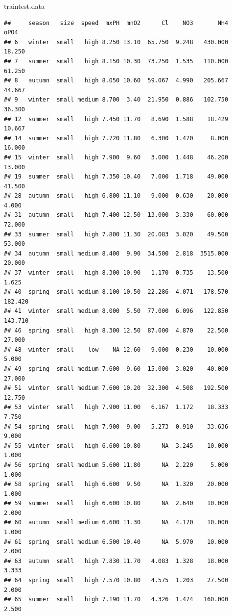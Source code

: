 \documentclass[]{report}
\newenvironment{Shaded}{\begin{snugshade}}{\end{snugshade}}
\newcommand{\NormalTok}[1]{#1}
\begin{document}
\begin{Shaded}
\begin{Highlighting}[]
\NormalTok{traintest.data}
\end{Highlighting}
\end{Shaded}

\begin{verbatim}
##     season   size  speed  mxPH  mnO2      Cl    NO3       NH4    oPO4
## 6   winter  small   high 8.250 13.10  65.750  9.248   430.000  18.250
## 7   summer  small   high 8.150 10.30  73.250  1.535   110.000  61.250
## 8   autumn  small   high 8.050 10.60  59.067  4.990   205.667  44.667
## 9   winter  small medium 8.700  3.40  21.950  0.886   102.750  36.300
## 12  summer  small   high 7.450 11.70   8.690  1.588    18.429  10.667
## 14  summer  small   high 7.720 11.80   6.300  1.470     8.000  16.000
## 15  winter  small   high 7.900  9.60   3.000  1.448    46.200  13.000
## 19  summer  small   high 7.350 10.40   7.000  1.718    49.000  41.500
## 28  autumn  small   high 6.800 11.10   9.000  0.630    20.000   4.000
## 31  autumn  small   high 7.400 12.50  13.000  3.330    60.000  72.000
## 33  summer  small   high 7.800 11.30  20.083  3.020    49.500  53.000
## 34  autumn  small medium 8.400  9.90  34.500  2.818  3515.000  20.000
## 37  winter  small   high 8.300 10.90   1.170  0.735    13.500   1.625
## 40  spring  small medium 8.100 10.50  22.286  4.071   178.570 182.420
## 41  winter  small medium 8.000  5.50  77.000  6.096   122.850 143.710
## 46  spring  small   high 8.300 12.50  87.000  4.870    22.500  27.000
## 48  winter  small    low    NA 12.60   9.000  0.230    10.000   5.000
## 49  spring  small medium 7.600  9.60  15.000  3.020    40.000  27.000
## 51  winter  small medium 7.600 10.20  32.300  4.508   192.500  12.750
## 53  winter  small   high 7.900 11.00   6.167  1.172    18.333   7.750
## 54  spring  small   high 7.900  9.00   5.273  0.910    33.636   9.000
## 55  winter  small   high 6.600 10.80      NA  3.245    10.000   1.000
## 56  spring  small medium 5.600 11.80      NA  2.220     5.000   1.000
## 58  spring  small   high 6.600  9.50      NA  1.320    20.000   1.000
## 59  summer  small   high 6.600 10.80      NA  2.640    10.000   2.000
## 60  autumn  small medium 6.600 11.30      NA  4.170    10.000   1.000
## 61  spring  small medium 6.500 10.40      NA  5.970    10.000   2.000
## 63  autumn  small   high 7.830 11.70   4.083  1.328    18.000   3.333
## 64  spring  small   high 7.570 10.80   4.575  1.203    27.500   2.000
## 65  summer  small   high 7.190 11.70   4.326  1.474   160.000   2.500

\end{verbatim}
\end{document}
